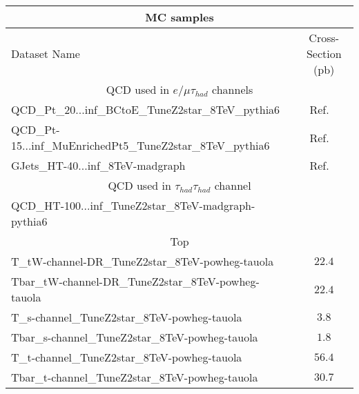 \begin{table}[!Hhtb]
\begin{center}
\small{
\begin{tabular}{|l|c|}
\hline\hline
\multicolumn{2}{|c|}{MC samples } \\
\hline\hline
Dataset Name                                            & Cross-Section (pb)    \\
\hline\hline
\multicolumn{2}{|c|}{QCD used in $e/\mu\tau_{had}$ channels }\\
\hline\hline
QCD\_Pt\_20...inf\_BCtoE\_TuneZ2star\_8TeV\_pythia6                & Ref. ~\cite{Prep}\\ 
QCD\_Pt-15...inf\_MuEnrichedPt5\_TuneZ2star\_8TeV\_pythia6         & Ref. ~\cite{Prep}\\
GJets\_HT-40...inf\_8TeV-madgraph                                  & Ref. ~\cite{Prep}\\
\hline\hline
\multicolumn{2}{|c|}{QCD used in $\tau_{had}\tau_{had}$ channel }\\
\hline\hline
QCD\_HT-100...inf\_TuneZ2star\_8TeV-madgraph-pythia6            &\\
\hline\hline

\multicolumn{2}{|c|}{Top }\\
\hline\hline
T\_tW-channel-DR\_TuneZ2star\_8TeV-powheg-tauola       & $22.4$                \\
Tbar\_tW-channel-DR\_TuneZ2star\_8TeV-powheg-tauola    & $22.4$\\
T\_s-channel\_TuneZ2star\_8TeV-powheg-tauola           & $3.8$\\%
Tbar\_s-channel\_TuneZ2star\_8TeV-powheg-tauola        & $1.8$\\%
T\_t-channel\_TuneZ2star\_8TeV-powheg-tauola           & $56.4$\\
Tbar\_t-channel\_TuneZ2star\_8TeV-powheg-tauola        & $30.7$\\


\end{tabular}}
\end{center}
\end{table}
